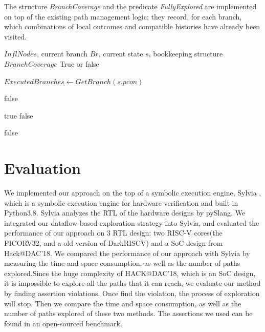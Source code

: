 \documentclass[conference]{IEEEtran}
\begin{document}
\noindent
The structure \textit{BranchCoverage} and the predicate \textit{FullyExplored} are implemented on top of the existing path
management logic; they record, for each branch, which combinations of local outcomes and compatible histories have already been visited.
\vspace{-4pt}
\begin{algorithm}[]
    \small
    \caption{ControlFlowPrune}
    \label{alg:prune_strategy_df}
    \begin{algorithmic}[1]
    \Require $InflNodes$, current branch $Br$, current state $s$, bookkeeping structure $BranchCoverage$
    \Ensure True or false 
    
    \State $ExecutedBranches \gets GetBranch(s.pcon)$
    \Statex \hspace{\algorithmicindent}

    
            \State \Return false
        \EndIf
    \EndFor
    
        \State \Return true
    \Else
        \State \Return false
    \EndIf
    
    \State \Return false
    \end{algorithmic}
\end{algorithm}

\vspace{-3mm}

\section{Evaluation}
\label{sec:evaluation}
We implemented our approach on the top of a symbolic execution engine, Sylvia \cite{Ryan2023Sylvia}, which is a symbolic execution engine for hardware verification and built in Python3.8. Sylvia analyzes the RTL of the hardware designs by pySlang. We integrated our dataflow-based exploration strategy into Sylvia, and evaluated the performance of our approach on 3 RTL design: two RISC-V cores(the PICORV32, and a old version of DarkRISCV) and a SoC design from Hack@DAC'18. We compared the performance of our approach with Sylvia by measuring the time and space consumption, as well as the number of paths explored.Since the huge complexity of HACK@DAC'18, which is an SoC design, it is impossible to explore all the paths that it can reach, we evaluate our method by finding assertion violations. Once find the violation, the process of exploration will stop. Then we compare the time and space consumption, as well as the number of paths explored of these two methods. The assertions we used can be found in an open-sourced benchmark\cite{rogers2025hardware}.
\end{document}
